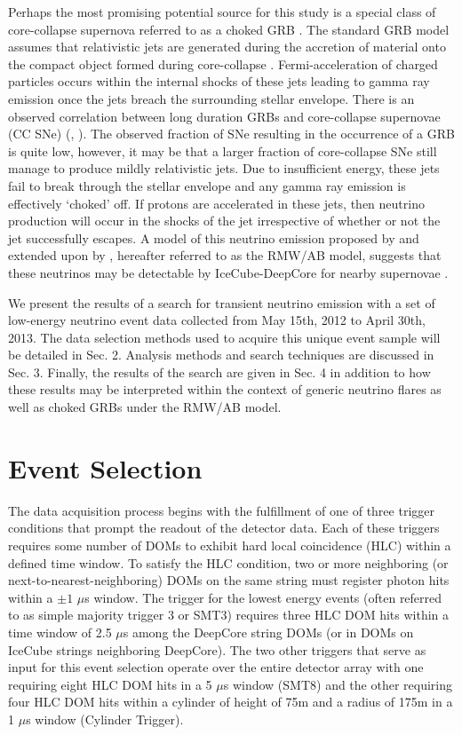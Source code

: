 \documentclass[manuscript]{aastex}
\begin{document}
Perhaps the most promising potential source for this study is a special class of core-collapse supernova referred to as a choked GRB \citep{2001PhRvL..87q1102M}. The standard GRB model assumes that relativistic jets are generated during the accretion of material onto the compact object formed during core-collapse \citep{1992MNRAS.258P..41R}. Fermi-acceleration of charged particles occurs within the internal shocks of these jets leading to gamma ray emission once the jets breach the surrounding stellar envelope. There is an observed correlation between long duration GRBs and core-collapse supernovae (CC SNe) (\citep{2006ARA&A..44..507W}, \citep{2011AN....332..434M}). The observed fraction of SNe resulting in the occurrence of a GRB is quite low, however, it may be that a larger fraction of core-collapse SNe still manage to produce mildly relativistic jets.  Due to insufficient energy, these jets fail to break through the stellar envelope and any gamma ray emission is effectively `choked' off. If protons are accelerated in these jets, then neutrino production will occur in the shocks of the jet irrespective of whether or not the jet successfully escapes. A model of this neutrino emission proposed by \cite{2004PhRvL..93r1101R} and extended upon by \cite{2005PhRvL..95f1103A}, hereafter referred to as the RMW/AB model, suggests that these neutrinos may be detectable by IceCube-DeepCore for nearby supernovae \citep{PhysRevD.81.083011}.

We present the results of a search for transient neutrino emission with a set of low-energy neutrino event data collected from May 15th, 2012 to April 30th, 2013. The data selection methods used to acquire this unique event sample will be detailed in Sec. 2. Analysis methods and search techniques are discussed in Sec. 3. Finally, the results of the search are given in Sec. 4 in addition to how these results may be interpreted within the context of generic neutrino flares as well as choked GRBs under the RMW/AB model.
\section{Event Selection}

The data acquisition process begins with the fulfillment of one of three trigger conditions that prompt the readout of the detector data. Each of these triggers requires some number of DOMs to exhibit hard local coincidence (HLC) within a defined time window. To satisfy the HLC condition, two or more neighboring (or next-to-nearest-neighboring) DOMs on the same string must register photon hits within a $\pm1$ $\mu$s window. The trigger for the lowest energy events (often referred to as simple majority trigger 3 or SMT3) requires three HLC DOM hits within a time window of 2.5 $\mu$s among the DeepCore string DOMs (or in DOMs on IceCube strings neighboring DeepCore). The two other triggers that serve as input for this event selection operate over the entire detector array with one requiring eight HLC DOM hits in a 5 $\mu$s window (SMT8) and the other requiring four HLC DOM hits within a cylinder of height of 75m and a radius of 175m in a 1 $\mu$s window (Cylinder Trigger).
\end{document}

